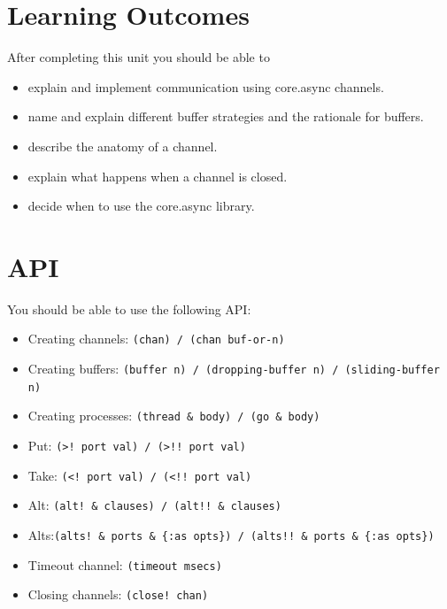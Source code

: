 \documentclass[11pt,a4paper]{article}
\begin{document}
\section{Learning Outcomes}

After completing this unit you should be able to

\begin{itemize}
	\item explain and implement communication using core.async channels.
	\item name and explain different buffer strategies and the rationale for buffers.
	\item describe the anatomy of a channel.
	\item explain what happens when a channel is closed.
	\item decide when to use the core.async library.
\end{itemize}

\section{API}
You should be able to use the following API:
\begin{itemize}
	\item Creating channels: \verb|(chan) / (chan buf-or-n)|
	\item Creating buffers: \verb|(buffer n) / (dropping-buffer n) / (sliding-buffer n)|
	\item Creating processes: \verb|(thread & body) / (go & body)|
	\item Put: \verb|(>! port val) / (>!! port val)|
	\item Take: \verb|(<! port val) / (<!! port val)|
	\item Alt: \verb|(alt! & clauses) / (alt!! & clauses)|
	\item Alts:\verb|(alts! & ports & {:as opts}) / (alts!! & ports & {:as opts})| 
	\item Timeout channel: \verb|(timeout msecs)|
	\item Closing channels: \verb|(close! chan)|
\end{itemize}
\end{document}
